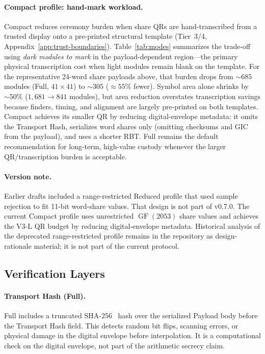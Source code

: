 \documentclass[11pt]{article}
\newcommand{\GF}{\operatorname{GF}}
\begin{document}
\paragraph{Compact profile: hand-mark workload.}\label{sec:qr-workload}
Compact reduces ceremony burden when share QRs are hand-transcribed from a trusted display onto a pre-printed structural template (Tier~3/4, Appendix~\ref{app:trust-boundaries}). Table~\ref{tab:modes} summarizes the trade-off using \emph{dark modules to mark} in the payload-dependent region---the primary physical transcription cost when light modules remain blank on the template. For the representative 24-word share payloads above, that burden drops from ${\sim}685$ modules (Full, $41\times 41$) to ${\sim}305$ (${\approx}55\%$ fewer). Symbol area alone shrinks by ${\sim}50\%$ ($1{,}681 \to 841$ modules), but area reduction overstates transcription savings because finders, timing, and alignment are largely pre-printed on both templates. Compact achieves its smaller QR by reducing digital-envelope metadata: it omits the Transport Hash, serializes word shares only (omitting checksums and GIC from the payload), and uses a shorter RBT. Full remains the default recommendation for long-term, high-value custody whenever the larger QR/transcription burden is acceptable.

\paragraph{Version note.}
Earlier drafts included a range-restricted Reduced profile that used sample rejection to fit 11-bit word-share values. That design is not part of v0.7.0. The current Compact profile uses unrestricted $\GF(2053)$ share values and achieves the V3-L QR budget by reducing digital-envelope metadata. Historical analysis of the deprecated range-restricted profile remains in the repository as design-rationale material; it is not part of the current protocol.

\subsection{Verification Layers}
\label{sec:transport-lock}

\paragraph{Transport Hash (Full).} Full includes a truncated SHA-256~\cite{fips1804} hash over the serialized Payload body before the Transport Hash field. This detects random bit flips, scanning errors, or physical damage in the digital envelope before interpolation. It is a computational check on the digital envelope, not part of the arithmetic secrecy claim.
\end{document}
